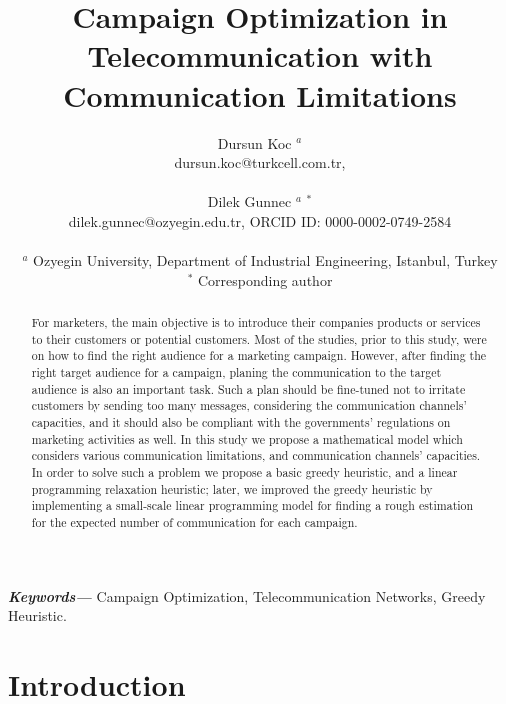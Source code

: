 \documentclass[11pt]{article}
\title{Campaign Optimization in Telecommunication with Communication Limitations\\}
\author{Dursun Koc $^{a}$ \\ 
	dursun.koc@turkcell.com.tr, \\\\
	Dilek Gunnec $^{a}$ $^{\ast}$\\ 
	dilek.gunnec@ozyegin.edu.tr, ORCID ID: 0000-0002-0749-2584 \\\\
$^{a}$ Ozyegin University, Department of Industrial Engineering, Istanbul, Turkey \\ 
$^{\ast}$ Corresponding author \\ }
\date{}
\providecommand{\keywords}[1]
{
  \small	
  \textbf{\textit{Keywords---}} #1
}
\begin{document}
\maketitle
\begin{abstract}
For marketers, the main objective is to introduce their companies products or services to their customers or potential customers. Most of the studies, prior to this study, were on how to find the right audience for a marketing campaign. However, after finding the right target audience for a campaign, planing the communication to the target audience is also an important task. Such a plan should be fine-tuned not to irritate customers by sending too many messages, considering the communication channels' capacities, and it should also be compliant with the governments' regulations on marketing activities as well. In this study we propose a mathematical model which considers various communication limitations, and communication channels' capacities. In order to solve such a problem we propose a basic greedy heuristic, and a linear programming relaxation heuristic; later, we improved the greedy heuristic by implementing a small-scale linear programming model for finding a rough estimation for the expected number of communication for each campaign.\end{abstract}\hspace{10pt}

\keywords{Campaign Optimization, Telecommunication Networks, Greedy Heuristic.}

\newpage

\section{Introduction}
\end{document}
